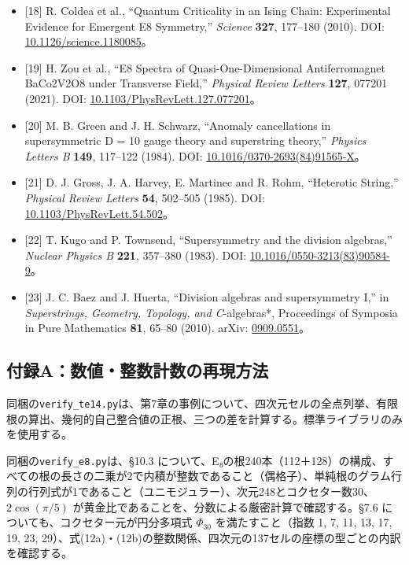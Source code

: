 \documentclass[
  a4paper,
]{ltjsarticle}
\begin{document}
\begin{itemize}
  4235--4248 (1989). DOI:
  \href{https://doi.org/10.1142/S0217751X8900176X}{10.1142/S0217751X8900176X}。
\item
  {[}18{]} R. Coldea et al., ``Quantum Criticality in an Ising Chain:
  Experimental Evidence for Emergent E8 Symmetry,'' \emph{Science}
  \textbf{327}, 177--180 (2010). DOI:
  \href{https://doi.org/10.1126/science.1180085}{10.1126/science.1180085}。
\item
  {[}19{]} H. Zou et al., ``E8 Spectra of Quasi-One-Dimensional
  Antiferromagnet BaCo2V2O8 under Transverse Field,'' \emph{Physical
  Review Letters} \textbf{127}, 077201 (2021). DOI:
  \href{https://doi.org/10.1103/PhysRevLett.127.077201}{10.1103/PhysRevLett.127.077201}。
\item
  {[}20{]} M. B. Green and J. H. Schwarz, ``Anomaly cancellations in
  supersymmetric D = 10 gauge theory and superstring theory,''
  \emph{Physics Letters B} \textbf{149}, 117--122 (1984). DOI:
  \href{https://doi.org/10.1016/0370-2693(84)91565-X}{10.1016/0370-2693(84)91565-X}。
\item
  {[}21{]} D. J. Gross, J. A. Harvey, E. Martinec and R. Rohm,
  ``Heterotic String,'' \emph{Physical Review Letters} \textbf{54},
  502--505 (1985). DOI:
  \href{https://doi.org/10.1103/PhysRevLett.54.502}{10.1103/PhysRevLett.54.502}。
\item
  {[}22{]} T. Kugo and P. Townsend, ``Supersymmetry and the division
  algebras,'' \emph{Nuclear Physics B} \textbf{221}, 357--380 (1983).
  DOI:
  \href{https://doi.org/10.1016/0550-3213(83)90584-9}{10.1016/0550-3213(83)90584-9}。
\item
  {[}23{]} J. C. Baez and J. Huerta, ``Division algebras and
  supersymmetry I,'' in \emph{Superstrings, Geometry, Topology, and
  C}-algebras*, Proceedings of Symposia in Pure Mathematics \textbf{81},
  65--80 (2010). arXiv:
  \href{https://arxiv.org/abs/0909.0551}{0909.0551}。
\end{itemize}

\subsection{付録A：数値・整数計数の再現方法}\label{ux4ed8ux9332aux6570ux5024ux6574ux6570ux8a08ux6570ux306eux518dux73feux65b9ux6cd5}

同梱の\texttt{verify\_\allowbreak{}te14.py}は、第7章の事例について、四次元セルの全点列挙、有限根の算出、幾何的自己整合値の正根、三つの差を計算する。標準ライブラリのみを使用する。

同梱の\texttt{verify\_\allowbreak{}e8.py}は、§10.3
について、E₈の根240本（112＋128）の構成、すべての根の長さの二乗が2で内積が整数であること（偶格子）、単純根のグラム行列の行列式が1であること（ユニモジュラー）、次元248とコクセター数30、\(2\cos(\pi/5)\)
が黄金比であることを、分数による厳密計算で確認する。§7.6
についても、コクセター元が円分多項式 \(\Phi_{30}\) を満たすこと（指数 1,
7, 11, 13, 17, 19, 23,
29）、式(12a)・(12b)の整数関係、四次元の137セルの座標の型ごとの内訳を確認する。
\end{document}
